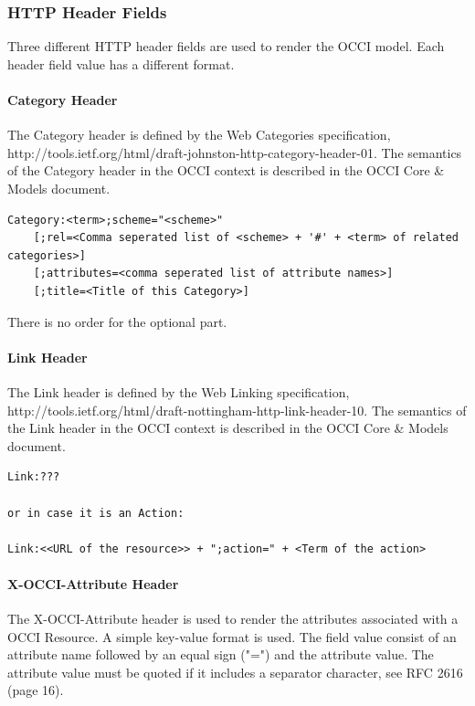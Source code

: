 \documentclass[10pt,a4paper]{article}
\begin{document}
\subsubsection{HTTP Header Fields}

Three different HTTP header fields are used to render the OCCI model. Each header field value has a different format.

\paragraph{Category Header}

The Category header is defined by the Web Categories specification, http://tools.ietf.org/html/draft-johnston-http-category-header-01. The semantics of the Category header in the OCCI context is described in the OCCI Core \& Models document.

\begin{verbatim}
Category:<term>;scheme="<scheme>"
    [;rel=<Comma seperated list of <scheme> + '#' + <term> of related categories>]
    [;attributes=<comma seperated list of attribute names>]
    [;title=<Title of this Category>]    
\end{verbatim}

There is no order for the optional part.

\paragraph{Link Header}

The Link header is defined by the Web Linking specification, http://tools.ietf.org/html/draft-nottingham-http-link-header-10. The semantics of the Link header in the OCCI context is described in the OCCI Core \& Models document.

\begin{verbatim}
Link:???

or in case it is an Action:

Link:<<URL of the resource>> + ";action=" + <Term of the action>
\end{verbatim}

\paragraph{X-OCCI-Attribute Header}

The X-OCCI-Attribute header is used to render the attributes associated with a OCCI Resource. A simple key-value format is used. The field value consist of an attribute name followed by an equal sign ("=") and the attribute value. The attribute value must be quoted if it includes a separator character, see RFC 2616 (page 16).
\end{document}
